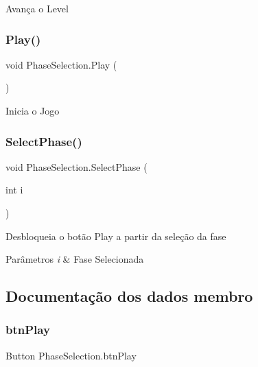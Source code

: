 Avança o Level 

\mbox{\label{class_phase_selection_afe954e403537aebc0f9e055bff5b3ccc}} 
\subsubsection{Play()}
{\footnotesize\ttfamily void Phase\+Selection.\+Play (\begin{DoxyParamCaption}{ }\end{DoxyParamCaption})}



Inicia o Jogo 

\mbox{\label{class_phase_selection_a1a0a69fe8ef63cd689c7fa01bcb35dce}} 
\subsubsection{SelectPhase()}
{\footnotesize\ttfamily void Phase\+Selection.\+Select\+Phase (\begin{DoxyParamCaption}\item[{int}]{i }\end{DoxyParamCaption})}



Desbloqueia o botão Play a partir da seleção da fase 


\begin{DoxyParams}{Parâmetros}
{\em i} & Fase Selecionada\\
\hline
\end{DoxyParams}


\subsection{Documentação dos dados membro}
\mbox{\label{class_phase_selection_a63ad0372fa65b1f25793550870b696b4}} 
\subsubsection{btnPlay}
{\footnotesize\ttfamily Button Phase\+Selection.\+btn\+Play}

\mbox{\label{class_phase_selection_a0df249da8b118e0983d10728f79c45f1}} 
